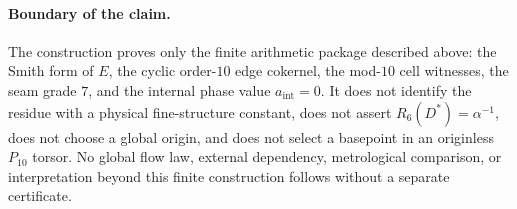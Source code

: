 \paragraph{Boundary of the claim.}
The construction proves only the finite arithmetic package described above: the Smith form of $E$, the cyclic order-$10$ edge cokernel, the mod-$10$ cell witnesses, the seam grade $7$, and the internal phase value $a_{\mathrm{int}}=0$. It does not identify the residue with a physical fine-structure constant, does not assert $R_6(D^*)=\alpha^{-1}$, does not choose a global origin, and does not select a basepoint in an originless $P_{10}$ torsor. No global flow law, external dependency, metrological comparison, or interpretation beyond this finite construction follows without a separate certificate.
